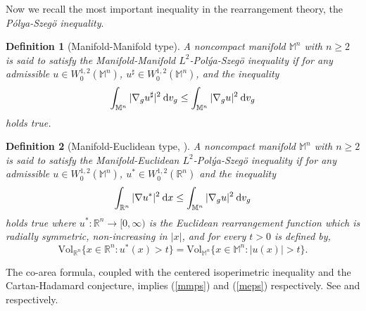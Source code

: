 \documentclass[a4paper,11pt,reqno]{amsart}
\renewcommand\eqref[1]{(\ref{#1})}
\theoremstyle{plain}
\newtheorem{definition}{Definition}[section]
\numberwithin{equation}{section} \allowdisplaybreaks
\newcommand{\dvg}{\: {\rm d}v_{g}}
\newcommand{\gradg}{\nabla_g}
\newcommand{\m}{\mathbb{M}^n}
\newcommand{\dx}{\:{\rm d}x}
\newcommand{\rn}{\mathbb{R}^n}
\begin{document}
Now we recall the most important inequality in the rearrangement theory, the \textit{P\'olya-Szeg\"o inequality}. \vspace{-15pt}
\begin{definition}[Manifold-Manifold type]
    A noncompact manifold $\m$ with $n\geq 2$ is said to satisfy the Manifold-Manifold $L^2$-Pol\'ya-Szeg\"o inequality if for any admissible $u\in W^{1,2}_0(\m)$, $u^\sharp\in W^{1,2}_0(\m)$, and the inequality
    \begin{equation}\label{mmps}
        \int_{\m}|\gradg u^\sharp|^2\dvg\leq \int_{\m}|\gradg u|^2\dvg
    \end{equation}
    holds true.
\end{definition}
\begin{definition}[Manifold-Euclidean type, \cite{DHV}]
    A noncompact manifold $\m$ with $n\geq 2$ is said to satisfy the Manifold-Euclidean $L^2$-Pol\'ya-Szeg\"o inequality if for any admissible $u\in W^{1,2}_0(\m)$, $u^*\in W^{1,2}_0(\rn)$ and the inequality
    \begin{equation}\label{meps}
        \int_{\rn}|\nabla u^*|^2\dx\leq \int_{\m}|\gradg u|^2\dvg
        \end{equation}
        holds true where $u^*:\rn\to[0,\infty)$ is the \textit{Euclidean rearrangement function}  which is radially symmetric, non-increasing in $|x|$, and for every $t>0$ is defined by,
        \begin{equation*}
            \mathrm{Vol}_{\rn}\{x\in\rn: u^*(x)>t\}=\mathrm{Vol}_{\m}\{x\in \m: |u(x)|>t\}.
        \end{equation*}
\end{definition}
The co-area formula, coupled with the centered isoperimetric inequality and the Cartan-Hadamard conjecture, implies \eqref{mmps} and \eqref{meps} respectively. See \cite{MV} and \cite{AK} respectively. 
\end{document}
